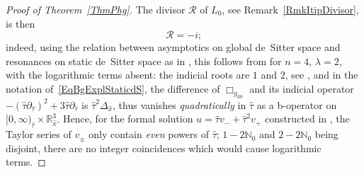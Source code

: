 \documentclass[reqno,11pt,letterpaper]{amsart}
\numberwithin{equation}{section}
\numberwithin{figure}{section}
\theoremstyle{definition}
\theoremstyle{remark}
\newcommand{\mc}{\mathcal}
\newcommand{\cR}{\mc R}
\newcommand{\N}{\mathbb{N}}
\newcommand{\R}{\mathbb{R}}
\newcommand{\dS}{{\mathrm{dS}}}
\newcommand{\pa}{\partial}
\newcommand{\usref}[1]{{\upshape\ref{#1}}}
\begin{document}
\begin{proof}[Proof of Theorem~\usref{ThmPhg}]
  The divisor $\cR$ of $L_0$, see Remark~\ref{RmkItipDivisor}, is then
  \begin{equation}
    \cR=-i;
  \end{equation}
  indeed, using the relation between asymptotics on global de~Sitter space and resonances on static de~Sitter space as in \cite[Appendix~C]{HintzVasyKdSStability}, this follows from \cite[Theorem~1.1]{VasyWaveOndS} for $n=4$, $\lambda=2$, with the logarithmic terms absent: the indicial roots are $1$ and $2$, see \cite[Lemma~4.13]{VasyWaveOndS}, and in the notation of~\eqref{EqBgExplStaticdS}, the difference of $\Box_{g_\dS}$ and its indicial operator $-(\hat\tau\pa_{\hat\tau})^2+3\hat\tau\pa_{\hat\tau}$ is $\hat\tau^2\Delta_{\hat x}$, thus vanishes \emph{quadratically} in $\hat\tau$ as a b-operator on $[0,\infty)_{\hat\tau}\times\R^3_{\hat x}$. Hence, for the formal solution $u=\hat\tau v_-+\hat\tau^2 v_+$ constructed in \cite[Lemma~4.13]{VasyWaveOndS}, the Taylor series of $v_\pm$ only contain \emph{even} powers of $\hat\tau$; $1-2\N_0$ and $2-2\N_0$ being disjoint, there are no integer coincidences which would cause logarithmic terms.
  

\end{proof}
\end{document}
